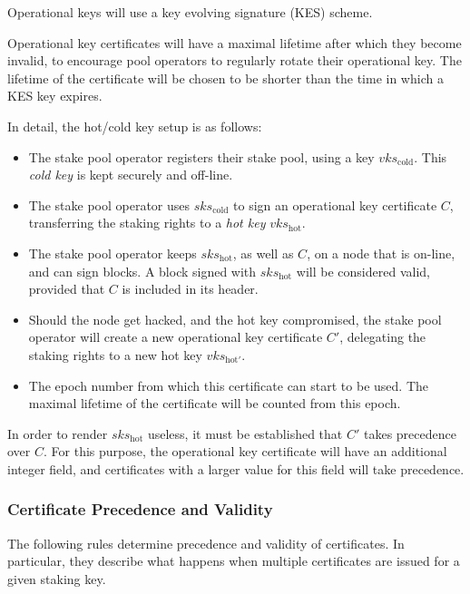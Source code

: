 \documentclass[11pt,a4paper]{article}
\begin{document}
Operational keys will use a key evolving signature (KES) scheme.

Operational key certificates will have a maximal lifetime after which they
become invalid, to encourage pool operators to regularly rotate their
operational key. The lifetime of the certificate will be chosen to be shorter
than the time in which a KES key expires.

In detail, the hot/cold key setup is as follows:

\begin{itemize}
\item
  The stake pool operator registers their stake pool, using a key
  \(vks_\text{cold}\). This \emph{cold key} is kept securely and
  off-line.
\item The stake pool operator uses \(sks_\text{cold}\)
  to sign an operational key certificate \(C\),
  transferring the staking rights to a \emph{hot key}
  \(vks_\text{hot}\).
\item
  The stake pool operator keeps \(sks_\text{hot}\), as well as \(C\), on
  a node that is on-line, and can sign blocks. A block signed with
  \(sks_\text{hot}\) will be considered valid, provided that \(C\) is
  included in its header.
\item
  Should the node get hacked, and the hot key compromised, the stake
  pool operator will create a new operational key certificate
  \(C'\), delegating the staking rights to a new hot key
  \(vks_{\text{hot}'}\).
\item
  The epoch number from which this certificate can start to be used. The maximal
  lifetime of the certificate will be counted from this epoch.
\end{itemize}

In order to render \(sks_\text{hot}\) useless, it must be established
that \(C'\) takes precedence over \(C\). For this purpose, the
operational key certificate will have an additional integer
field, and certificates with a larger value for this field will take
precedence.

\subsubsection{Certificate Precedence and Validity}
\label{certificate-precedence-and-validity}

The following rules determine precedence and validity of certificates.
In particular, they describe what happens when multiple certificates are
issued for a given staking key.
\end{document}
